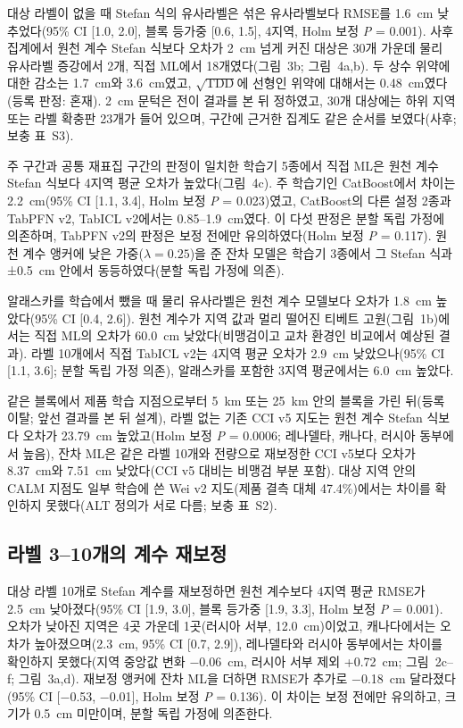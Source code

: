 대상 라벨이 없을 때 Stefan 식의 유사라벨은 섞은 유사라벨보다 RMSE를 1.6~cm 낮추었다(95\% CI [1.0, 2.0], 블록 등가중 [0.6, 1.5], 4지역, Holm 보정 \textit{P} = 0.001). 사후 집계에서 원천 계수 Stefan 식보다 오차가 2~cm 넘게 커진 대상은 30개 가운데 물리 유사라벨 증강에서 2개, 직접 ML에서 18개였다(그림~3b; 그림~4a,b).
두 상수 위약에 대한 감소는 1.7~cm와 3.6~cm였고, $\sqrt{\mathrm{TDD}}$에 선형인 위약에 대해서는 0.48~cm였다(등록 판정: 혼재).
2~cm 문턱은 전이 결과를 본 뒤 정하였고, 30개 대상에는 하위 지역 또는 라벨 확충판 23개가 들어 있으며, 구간에 근거한 집계도 같은 순서를 보였다(사후; 보충 표~S3).

주 구간과 공통 재표집 구간의 판정이 일치한 학습기 5종에서 직접 ML은 원천 계수 Stefan 식보다 4지역 평균 오차가 높았다(그림~4c).
주 학습기인 CatBoost에서 차이는 2.2~cm(95\% CI [1.1, 3.4], Holm 보정 \textit{P} = 0.023)였고, CatBoost의 다른 설정 2종과 TabPFN v2, TabICL v2에서는 0.85--1.9~cm였다.
이 다섯 판정은 분할 독립 가정에 의존하며, TabPFN v2의 판정은 보정 전에만 유의하였다(Holm 보정 \textit{P} = 0.117).
원천 계수 앵커에 낮은 가중($\lambda = 0.25$)을 준 잔차 모델은 학습기 3종에서 그 Stefan 식과 ±0.5~cm 안에서 동등하였다(분할 독립 가정에 의존).

알래스카를 학습에서 뺐을 때 물리 유사라벨은 원천 계수 모델보다 오차가 1.8~cm 높았다(95\% CI [0.4, 2.6]).
원천 계수가 지역 값과 멀리 떨어진 티베트 고원(그림~1b)에서는 직접 ML의 오차가 60.0~cm 낮았다(비맹검이고 교차 환경인 비교에서 예상된 결과).
라벨 10개에서 직접 TabICL v2는 4지역 평균 오차가 2.9~cm 낮았으나(95\% CI [1.1, 3.6]; 분할 독립 가정 의존), 알래스카를 포함한 3지역 평균에서는 6.0~cm 높았다.

같은 블록에서 제품 학습 지점으로부터 5~km 또는 25~km 안의 블록을 가린 뒤(등록 이탈; 앞선 결과를 본 뒤 설계), 라벨 없는 기존 CCI v5 지도는 원천 계수 Stefan 식보다 오차가 23.79~cm 높았고(Holm 보정 \textit{P} = 0.0006; 레나델타, 캐나다, 러시아 동부에서 높음), 잔차 ML은 같은 라벨 10개와 전량으로 재보정한 CCI v5보다 오차가 8.37~cm와 7.51~cm 낮았다(CCI v5 대비는 비맹검 부분 포함). 대상 지역 안의 CALM 지점도 일부 학습에 쓴 Wei v2 지도(제품 결측 대체 47.4\%)에서는 차이를 확인하지 못했다(ALT 정의가 서로 다름; 보충 표~S2).

\subsection{라벨 3--10개의 계수 재보정}\label{sec:results-recal}

대상 라벨 10개로 Stefan 계수를 재보정하면 원천 계수보다 4지역 평균 RMSE가 2.5~cm 낮아졌다(95\% CI [1.9, 3.0], 블록 등가중 [1.9, 3.3], Holm 보정 \textit{P} = 0.001). 오차가 낮아진 지역은 4곳 가운데 1곳(러시아 서부, 12.0~cm)이었고, 캐나다에서는 오차가 높아졌으며(2.3~cm, 95\% CI [0.7, 2.9]), 레나델타와 러시아 동부에서는 차이를 확인하지 못했다(지역 중앙값 변화 −0.06~cm, 러시아 서부 제외 +0.72~cm; 그림~2c--f; 그림~3a,d).
재보정 앵커에 잔차 ML을 더하면 RMSE가 추가로 −0.18~cm 달라졌다(95\% CI [−0.53, −0.01], Holm 보정 \textit{P} = 0.136). 이 차이는 보정 전에만 유의하고, 크기가 0.5~cm 미만이며, 분할 독립 가정에 의존한다.

